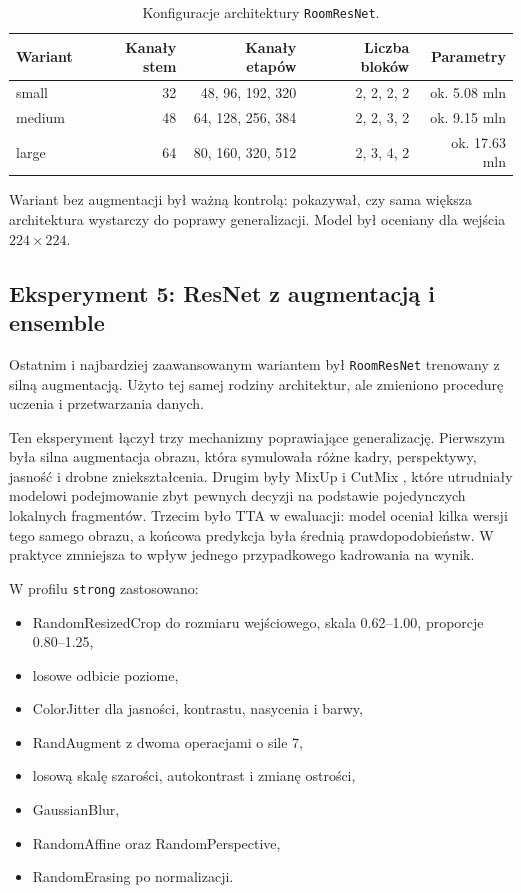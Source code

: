 \documentclass[12pt,a4paper]{article}
\begin{document}
\begin{table}[H]
\centering
\caption{Konfiguracje architektury \texttt{RoomResNet}.}
\label{tab:roomresnet_configs}
\begin{tabular}{lrrrr}
\toprule
Wariant & Kanały stem & Kanały etapów & Liczba bloków & Parametry \\
\midrule
small & 32 & 48, 96, 192, 320 & 2, 2, 2, 2 & ok. 5.08 mln \\
medium & 48 & 64, 128, 256, 384 & 2, 2, 3, 2 & ok. 9.15 mln \\
large & 64 & 80, 160, 320, 512 & 2, 3, 4, 2 & ok. 17.63 mln \\
\bottomrule
\end{tabular}
\end{table}

Wariant bez augmentacji był ważną kontrolą: pokazywał, czy sama większa architektura wystarczy do poprawy generalizacji. Model był oceniany dla wejścia \(224 \times 224\).

\subsection{Eksperyment 5: ResNet z augmentacją i ensemble}

Ostatnim i najbardziej zaawansowanym wariantem był \texttt{RoomResNet} trenowany z silną augmentacją. Użyto tej samej rodziny architektur, ale zmieniono procedurę uczenia i przetwarzania danych.

Ten eksperyment łączył trzy mechanizmy poprawiające generalizację. Pierwszym była silna augmentacja obrazu, która symulowała różne kadry, perspektywy, jasność i drobne zniekształcenia. Drugim były MixUp \cite{mixup} i CutMix \cite{cutmix}, które utrudniały modelowi podejmowanie zbyt pewnych decyzji na podstawie pojedynczych lokalnych fragmentów. Trzecim było TTA w ewaluacji: model oceniał kilka wersji tego samego obrazu, a końcowa predykcja była średnią prawdopodobieństw. W praktyce zmniejsza to wpływ jednego przypadkowego kadrowania na wynik.

\noindent
W profilu \texttt{strong} zastosowano:
\begin{itemize}
  \item RandomResizedCrop do rozmiaru wejściowego, skala 0.62--1.00, proporcje 0.80--1.25,
  \item losowe odbicie poziome,
  \item ColorJitter dla jasności, kontrastu, nasycenia i barwy,
  \item RandAugment \cite{randaugment} z dwoma operacjami o sile 7,
  \item losową skalę szarości, autokontrast i zmianę ostrości,
  \item GaussianBlur,
  \item RandomAffine oraz RandomPerspective,
  \item RandomErasing po normalizacji.
\end{itemize}
\end{document}
